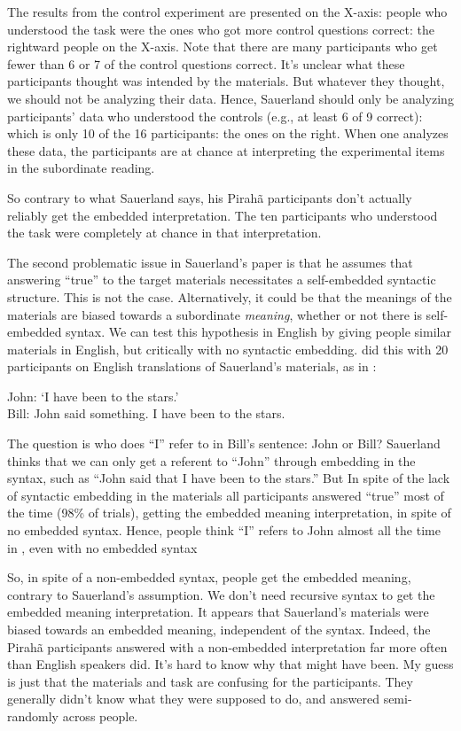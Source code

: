 \documentclass{article}
\begin{document}
The results from the control experiment are presented on the X-axis:  people who understood the task were the ones who got more control questions correct: the rightward people on the X-axis.  Note that there are many participants who get fewer than 6 or 7 of the control questions correct.  It's unclear what these participants thought was intended by the materials.  But whatever they thought, we should not be analyzing their data. Hence, Sauerland should only be analyzing participants’ data who understood the controls (e.g., at least 6 of 9 correct):  which is only 10 of the 16 participants: the ones on the right. When one analyzes these data, the participants are at chance at interpreting the experimental items in the subordinate reading.

So contrary to what Sauerland says, his Pirahã participants don’t actually reliably get the embedded interpretation. The ten participants who understood the task were completely at chance in that interpretation.

The second problematic issue in Sauerland's paper is that he assumes that answering ``true'' to the target materials necessitates a self-embedded syntactic structure.  This is not the case.  Alternatively, it could be that the meanings of the materials are biased towards a subordinate \textit{meaning}, whether or not there is self-embedded syntax.  We can test this hypothesis in English by giving people similar materials in English, but critically with no syntactic embedding.  \citet{everett2019recursion} did this with 20 participants on English translations of Sauerland's materials, as in : 

\ea
\label{ev_gib2019_ex}
John: ‘I have been to the stars.’\\
Bill: John said something. I have been to the stars.
\z

The question is who does ``I'' refer to in Bill’s sentence:  John or Bill? Sauerland thinks that we can only get a referent to ``John'' through embedding in the syntax, such as ``John said that I have been to the stars.''  But In spite of the lack of syntactic embedding in the materials all participants answered ``true'' most of the time (98\% of trials), getting the embedded meaning interpretation, in spite of no embedded syntax.  Hence, people think ``I'' refers to John almost all the time in , even with no embedded syntax

So, in spite of a non-embedded syntax, people get the embedded meaning, contrary to Sauerland’s assumption.  We don’t need recursive syntax to get the embedded meaning interpretation.  It appears that Sauerland's materials were biased towards an embedded meaning, independent of the syntax. Indeed, the Pirahã participants answered with a non-embedded interpretation far more often than English speakers did. It's hard to know why that might have been.  My guess is just that the materials and task are confusing for the participants.  They generally didn't know what they were supposed to do, and answered semi-randomly across people.
\end{document}
